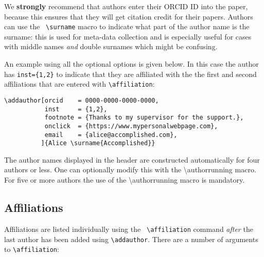 \documentclass{iacrcc}
\begin{document}
\noindent We \textbf{strongly} recommend that authors enter their
ORCID ID into the paper, because this ensures that they will get
citation credit for their papers. Authors can use the {\tt
  \textbackslash{}surname} macro to indicate what part of the author
name is the surname: this is used for meta-data collection and is
especially useful for cases with middle names \emph{and} double
surnames which might be confusing.

An example using all the optional options is given below. In this case
the author has \verb+inst={1,2}+ to indicate that they are affiliated with
the the first and second affiliations that are entered with
\verb+\affiliation+:

\begin{verbatim}
\addauthor[orcid    = 0000-0000-0000-0000,
           inst     = {1,2},
           footnote = {Thanks to my supervisor for the support.},
           onclick  = {https://www.mypersonalwebpage.com},
           email    = {alice@accomplished.com},
          ]{Alice \surname{Accomplished}}
\end{verbatim}

The author names displayed in the header are constructed automatically for 
four authors or less. One can optionally modify this with the
\textbackslash{}authorrunning macro.
For five or more authors the use of the \textbackslash{}authorrunning macro
is mandatory.

\subsection{Affiliations}
Affiliations are listed individually using the {\tt
  \textbackslash{}affiliation} command \emph{after} the last author
has been added using {\tt \textbackslash{}addauthor}.  There are a number
of arguments to {\tt \textbackslash{}affiliation}:
\end{document}
